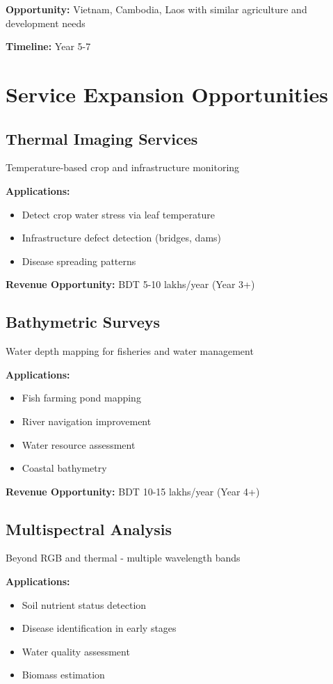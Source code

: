 \textbf{Opportunity:} Vietnam, Cambodia, Laos with similar agriculture and development needs

\textbf{Timeline:} Year 5-7

\section{Service Expansion Opportunities}

\subsection{Thermal Imaging Services}

Temperature-based crop and infrastructure monitoring

\textbf{Applications:}
\begin{itemize}
    \item Detect crop water stress via leaf temperature
    \item Infrastructure defect detection (bridges, dams)
    \item Disease spreading patterns
\end{itemize}

\textbf{Revenue Opportunity:} BDT 5-10 lakhs/year (Year 3+)

\subsection{Bathymetric Surveys}

Water depth mapping for fisheries and water management

\textbf{Applications:}
\begin{itemize}
    \item Fish farming pond mapping
    \item River navigation improvement
    \item Water resource assessment
    \item Coastal bathymetry
\end{itemize}

\textbf{Revenue Opportunity:} BDT 10-15 lakhs/year (Year 4+)

\subsection{Multispectral Analysis}

Beyond RGB and thermal - multiple wavelength bands

\textbf{Applications:}
\begin{itemize}
    \item Soil nutrient status detection
    \item Disease identification in early stages
    \item Water quality assessment
    \item Biomass estimation
\end{itemize}

